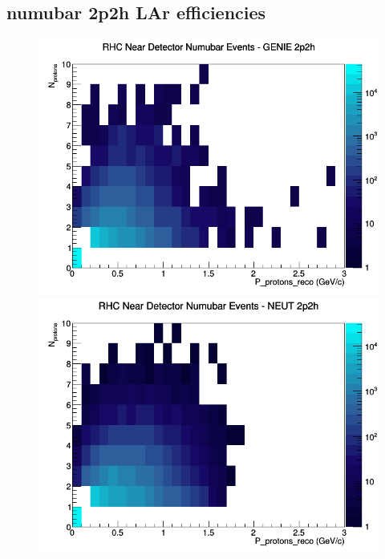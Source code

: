 \documentclass[12pt]{article}
\begin{document}
\subsection{numubar 2p2h LAr efficiencies}
\begin{figure}[h]
\includegraphics[width=\linewidth]{eff_N_P/LAr/protons/2p2h_RHC_ND_numubar_N_P_GENIE.png}
\endminipage
{}
\includegraphics[width=\linewidth]{eff_N_P/LAr/protons/2p2h_RHC_ND_numubar_N_P_NEUT.png}
\endminipage
{}

\end{figure}
\end{document}
